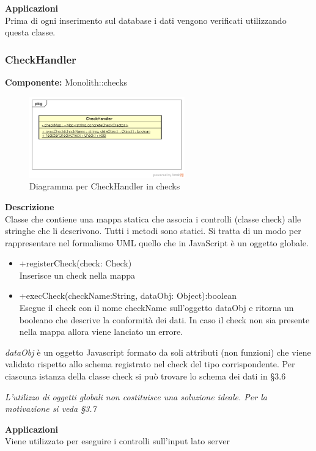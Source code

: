 \textbf{Applicazioni}\\
Prima di ogni inserimento sul database i dati vengono verificati utilizzando questa classe. 


\clearpage

\subsubsection{CheckHandler}
\textbf{Componente:}  Monolith::checks\\
   \FloatBarrier
   \begin{figure}[ht]
   \centering
   \includegraphics[width=0.6\textwidth]{img/single-CheckHandler.png}
   \caption{{Diagramma per CheckHandler in checks}}
\end{figure}
\FloatBarrier
\textbf{Descrizione}\\
Classe che contiene una mappa statica che associa i controlli (classe check) alle stringhe che li descrivono. Tutti i metodi sono statici. Si tratta di un modo per rappresentare nel formalismo UML quello che in JavaScript è un oggetto globale.
\begin{itemize}
\item +registerCheck(check: Check) \\
Inserisce un check nella mappa
\item +execCheck(checkName:String, dataObj: Object):boolean \\
Esegue il check con il nome checkName sull'oggetto dataObj e ritorna un booleano che descrive la conformità dei dati. In caso il check non sia presente nella mappa allora viene lanciato un errore.
\end{itemize}
\emph{dataObj} è un oggetto Javascript formato da soli attributi (non funzioni) che viene validato rispetto allo schema registrato nel check del tipo corrispondente. Per ciascuna istanza della classe check si può trovare lo schema dei dati in \S 3.6

\emph{L'utilizzo di oggetti globali non costituisce una soluzione ideale. Per la motivazione si veda \S 3.7} 


\textbf{Applicazioni}\\
Viene utilizzato per eseguire i controlli sull'input lato server 


